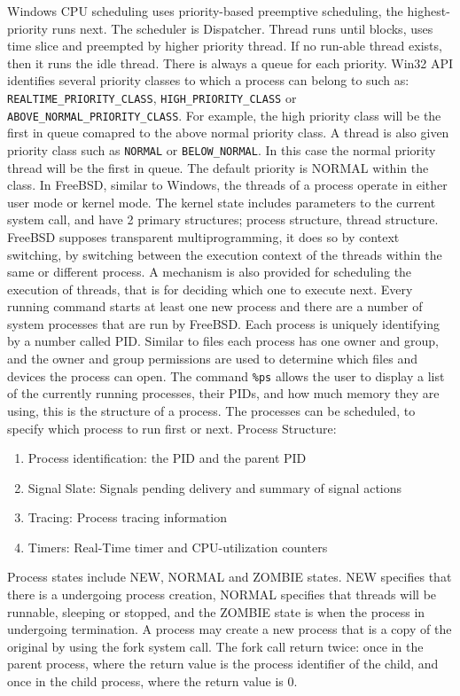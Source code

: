 \documentclass[letterpaper,10pt,draftclsnofoot,onecolumn]{IEEEtran}
\begin{document}
Windows CPU scheduling uses priority-based preemptive scheduling, the highest-priority runs next. The scheduler is Dispatcher. Thread runs until blocks, uses time slice and preempted by higher priority thread. If no run-able thread exists, then it runs the idle thread. There is always a queue for each priority. Win32 API identifies several priority classes to which a process can belong to such as: \verb|REALTIME_PRIORITY_CLASS|, \verb|HIGH_PRIORITY_CLASS| or \verb|ABOVE_NORMAL_PRIORITY_CLASS|. For example, the high priority class will be the first in queue comapred to the above normal priority class. A thread is also given priority class such as \verb|NORMAL| or \verb|BELOW_NORMAL|. In this case the normal priority thread will be the first in queue. The default priority is NORMAL within the class.
In FreeBSD, similar to Windows, the threads of a process operate in either user mode or kernel mode. The kernel state includes parameters to the current system call, and have 2 primary structures; process structure, thread structure. FreeBSD supposes transparent multiprogramming, it does so by context switching, by switching between the execution context of the threads within the same or different process. A mechanism is also provided for scheduling the execution of threads, that is for deciding which one to execute next.
Every running command starts at least one new process and there are a number of system processes that are run by FreeBSD. Each process is uniquely identifying by a number called PID. Similar to files each process has one owner and group, and the owner and group permissions are used to determine which files and devices the process can open. The command \verb|%ps| allows the user to display a list of the currently running processes, their PIDs, and how much memory they are using, this is the structure of a process. The processes can be scheduled, to specify which process to run first or next.\cite{[2]}
Process Structure:
\begin{enumerate}
\item Process identification: the PID and the parent PID
\item Signal Slate: Signals pending delivery and summary of signal actions
\item Tracing: Process tracing information
\item Timers: Real-Time timer and CPU-utilization counters
\end{enumerate}
Process states include NEW, NORMAL and ZOMBIE states. NEW specifies that there is a undergoing process creation, NORMAL specifies that threads will be runnable, sleeping or stopped, and the ZOMBIE state is when the process in undergoing termination. A process may create a new process that is a copy of the original by using the fork system call. The fork call return twice: once in the parent process, where the return value is the process identifier of the child, and once in the child process, where the return value is 0.
\end{document}
